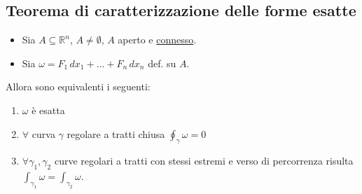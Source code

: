 \subsection{Teorema di caratterizzazione delle forme esatte}

\begin{theorem}
\begin{itemize}
    \item Sia $A \subseteq \mathbb{R}^n$, $A \neq \emptyset$, $A$ aperto e \underline{connesso}.
    \item Sia $\omega = F_1\, dx_1 + \dots + F_n\, dx_n$ def. su $A$.
\end{itemize}
Allora sono equivalenti i seguenti:
\begin{enumerate}
    \item $\omega$ è esatta
    \item $\forall$ curva $\gamma$ regolare a tratti chiusa $\displaystyle\oint_\gamma \omega = 0$
    \item $\forall \gamma_1, \gamma_2$ curve regolari a tratti con stessi estremi e verso di percorrenza risulta $\displaystyle\int_{\gamma_1} \omega = \int_{\gamma_2} \omega$.
\end{enumerate}
\end{theorem}


